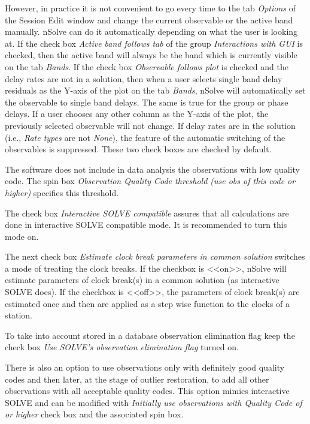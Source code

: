 \documentclass [10pt,letterpaper]{report}
\newcommand{\nuSolve}{\greektext n\latintext Solve}
\begin{document}
However, in practice it is not convenient to go every time to the tab
{\sl Options} of the Session Edit window and change the current
observable or the active band manually. \nuSolve{} can do it
automatically depending on what the user is looking at. If the check box
{\sl Active band follows tab} of the group {\sl Interactions with GUI} is
checked, then the active band will always be the band which is currently
visible on the tab {\sl Bands}. If the check box {\sl Observable follows
plot} is checked and the delay rates are not in a solution, then when a
user selects single band delay residuals as the Y-axis of the plot on the
tab {\sl Bands}, \nuSolve{} will automatically set the observable to
single band delays. The same is true for the group or phase delays. If a
user chooses any other column as the Y-axis of the plot, the previously
selected observable will not change. If delay rates are in the solution
(i.e., {\sl Rate types} are not {\sl None}), the feature of the automatic
switching of the observables is suppressed. These two check boxes are
checked by default.

The software does not include in data analysis the observations with low
quality code. The spin box {\sl Observation Quality Code threshold (use
obs of this code or higher)} specifies this threshold.

The check box {\sl Interactive SOLVE compatible} assures that all
calculations are done in interactive SOLVE compatible mode. It is recommended
to turn this mode on.

The next check box {\sl Estimate clock break parameters in common solution}
switches a mode of treating the clock breaks. If the checkbox is <<on>>,
\nuSolve{} will estimate parameters of clock break(s) in a common solution
(as interactive SOLVE does). If the checkbox is <<off>>, the parameters of
clock break(s) are estimated once and then are applied as a step wise
function to the clocks of a station.

To take into account stored in a database observation elimination flag
keep the check box {\sl Use SOLVE's observation elimination flag}
turned on.

There is also an option to use observations only with definitely good
quality codes and then later, at the stage of outlier restoration, to
add all other observations with all acceptable quality codes. This
option mimics interactive SOLVE and can be modified with {\sl Initially
use observations with Quality Code of or higher} check box and the
associated spin box.
\end{document}
